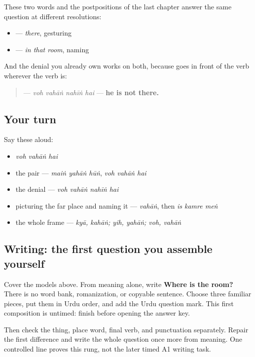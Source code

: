 \begin{grammarlens}[title={Grammar Lens: what a place word can now do}]
These two words and the postpositions of the last chapter answer the same question at different resolutions:

\begin{itemize}
\raggedright
  \item \textbf{} — \emph{there}, gesturing
  \item \textbf{  } — \emph{in that room}, naming
\end{itemize}

And the denial you already own works on both, because \textbf{} goes in front of the verb wherever the verb is:

\begin{quote}
\textbf{   } — \emph{voh vahāṅ nahīṅ hai} — \textbf{he is not there.}
\end{quote}
\end{grammarlens}

\subsection*{Your turn}
Say these aloud:

\begin{itemize}
\raggedright
  \item \emph{voh vahāṅ hai}
  \item the pair — \emph{maiṅ yahāṅ hūṅ}, \emph{voh vahāṅ hai}
  \item the denial — \emph{voh vahāṅ nahīṅ hai}
  \item picturing the far place and naming it — \emph{vahāṅ}, then \emph{is kamre meṅ}
  \item the whole frame — \emph{kyā, kahāṅ; yih, yahāṅ; voh, vahāṅ}
\end{itemize}

\subsection*{Writing: the first question you assemble yourself}
Cover the models above. From meaning alone, write \textbf{Where is the room?} There is no word bank, romanization, or copyable sentence. Choose three familiar pieces, put them in Urdu order, and add the Urdu question mark. This first composition is untimed: finish before opening the answer key.

Then check the thing, place word, final verb, and punctuation separately. Repair the first difference and write the whole question once more from meaning. One controlled line proves this rung, not the later timed A1 writing task.

